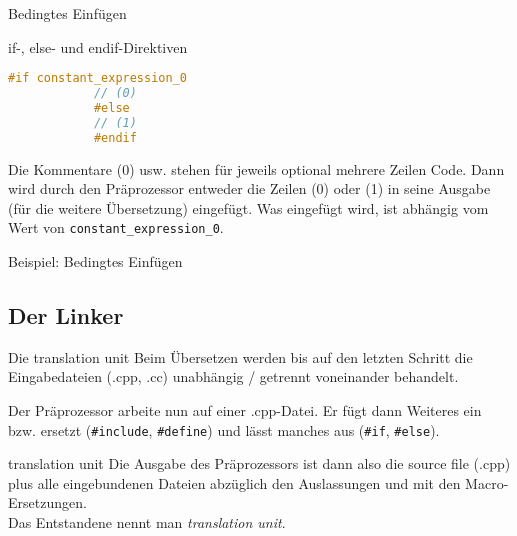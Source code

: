 \begin{frame}[fragile]{Bedingtes Einfügen}
	\begin{block}{if-, else- und endif-Direktiven}
		\begin{lstlisting}[language=C++]
			#if constant_expression_0
			// (0)
			#else
			// (1)
			#endif
		\end{lstlisting}
		Die Kommentare (0) usw. stehen für jeweils optional mehrere Zeilen Code.
		Dann wird durch den Präprozessor entweder die Zeilen (0) oder (1) in seine Ausgabe (für die weitere Übersetzung) eingefügt. Was eingefügt wird, ist abhängig vom Wert von \verb|constant_expression_0|.
	\end{block}
\end{frame}

\begin{frame}{Beispiel: Bedingtes Einfügen}
	\footnotesize
	
\end{frame}




\subsection{Der Linker}

\begin{frame}[fragile]{Die translation unit}
	Beim Übersetzen werden bis auf den letzten Schritt die Eingabedateien (.cpp, .cc) unabhängig / getrennt voneinander behandelt.
	
	Der Präprozessor arbeite nun auf einer .cpp-Datei. Er fügt dann Weiteres ein bzw. ersetzt (\verb|#include|, \verb|#define|) und lässt manches aus (\verb|#if|, \verb|#else|).
	
	\vspace{1em}
	
	\begin{block}{translation unit}
		Die Ausgabe des Präprozessors ist dann also die source file (.cpp) plus alle eingebundenen Dateien abzüglich den Auslassungen und mit den Macro-Ersetzungen.\\
		Das Entstandene nennt man \emph{translation unit}.
	\end{block}
\end{frame}

